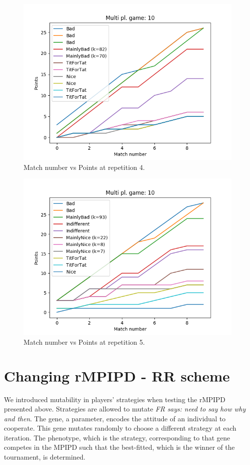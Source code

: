 \documentclass[journal,a4paper,10pt,twoside]{IEEEtran}
\newcommand{\FR}[1]{\textit{\color{ForestGreen}FR says: #1}}
\begin{document}
\begin{figure}[ht]
    \centering
    \includegraphics[width=1\columnwidth]{../img_v1/ridpmp-scores-10-r3.png}
    \caption{Match number vs Points at repetition 4.}
    \label{fig:rmpipd4}
\end{figure}

\begin{figure}[ht]
    \centering
    \includegraphics[width=1\columnwidth]{../img_v1/ridpmp-scores-10-r4.png}
    \caption{Match number vs Points at repetition 5.}
    \label{fig:rmpipd5}
\end{figure}

\newpage
\section{Changing rMPIPD - RR scheme} \label{s:crIPDMP}
We introduced mutability in players' strategies when testing the rMPIPD presented above.
Strategies are allowed to mutate \FR{need to say how why and then}.
The gene, a parameter, encodes the attitude of an individual to cooperate. This gene mutates randomly to choose a different strategy at each iteration. The phenotype, which is the strategy, corresponding to that gene competes in the MPIPD such that the best-fitted, which is the winner of the tournament, is determined.
\end{document}
